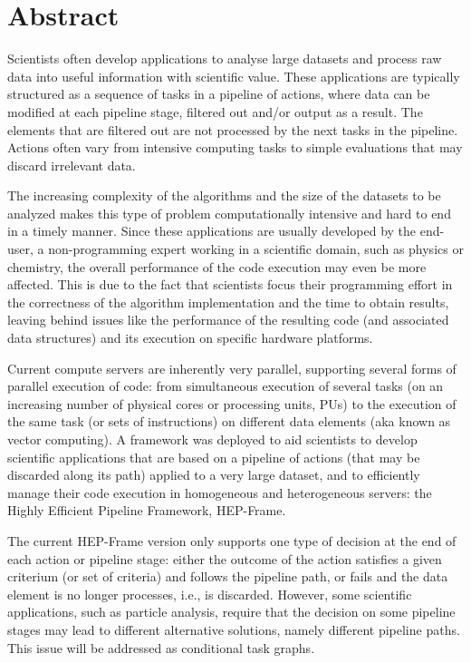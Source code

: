 \documentclass[
  oneside,
  11pt, a4paper,
  footinclude=true,
  headinclude=true,
  cleardoublepage=empty
]{scrbook}
\author{José Pedro Moreira Resende}
\date{\myear} %
\begin{document}
	\umfrontcover	
	\umtitlepage
	

	\chapter*{Abstract}
Scientists often develop applications to analyse large datasets and process raw data into useful information with scientific value. These applications are typically structured as a sequence of tasks in a pipeline of actions, where data can be modified at each pipeline stage, filtered out and/or output as a result. The elements that are filtered out are not processed by the next tasks in the pipeline. Actions often vary from intensive computing tasks to simple evaluations that may discard irrelevant data.
\par The increasing complexity of the algorithms and the size of the datasets to be analyzed makes this type of problem computationally intensive and hard to end in a timely manner. Since these applications are usually developed by the end-user, a non-programming expert working in a scientific domain, such as physics or chemistry, the overall performance of the code execution may even be more affected. This is due to the fact that scientists focus their programming effort in the correctness of the algorithm implementation and the time to obtain results, leaving behind issues like the performance of the resulting code (and associated data structures) and its execution on specific hardware platforms.
\par Current compute servers are inherently very parallel, supporting several forms of parallel execution of code: from simultaneous execution of several tasks (on an increasing number of physical cores or processing units, PUs) to the execution of the same task (or sets of instructions) on different data elements (aka known as vector computing). A framework was deployed to aid scientists to develop scientific applications that are based on a pipeline of actions (that may be discarded along its path) applied to a very large dataset, and to efficiently manage their code execution in homogeneous and heterogeneous servers: the Highly Efficient Pipeline Framework, HEP-Frame.
\par The current HEP-Frame version only supports one type of decision at the end of each action or pipeline stage: either the outcome of the action satisfies a given criterium (or set of criteria) and follows the pipeline path, or fails and the data element is no longer processes, i.e., is discarded. However, some scientific applications, such as particle analysis, require that the decision on some pipeline stages may lead to different alternative solutions, namely different pipeline paths. This issue will be addressed as conditional task graphs.
	
\end{document}
